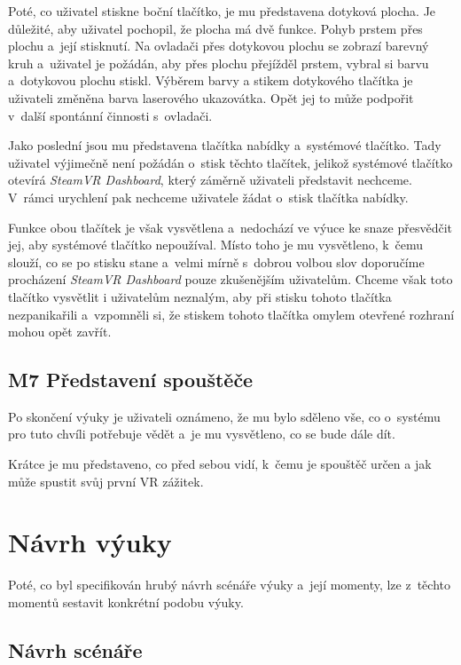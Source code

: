 Poté, co uživatel stiskne boční tlačítko, je mu představena dotyková
plocha. Je důležité, aby uživatel pochopil, že plocha má dvě funkce. Pohyb
prstem přes plochu a~její stisknutí. Na ovladači přes dotykovou plochu
se zobrazí barevný kruh a~uživatel je požádán, aby přes plochu přejížděl
prstem, vybral si barvu a~dotykovou plochu stiskl. Výběrem barvy a
stikem dotykového tlačítka je uživateli změněna barva laserového
ukazovátka. Opět jej to může podpořit v~další spontánní činnosti
s~ovladači.

Jako poslední jsou mu představena tlačítka nabídky a~systémové tlačítko.
Tady uživatel výjimečně není požádán o~stisk těchto tlačítek, jelikož
systémové tlačítko otevírá \emph{SteamVR Dashboard}, který záměrně
uživateli představit nechceme. V~rámci urychlení pak nechceme uživatele
žádat o~stisk tlačítka nabídky.

Funkce obou tlačítek je však vysvětlena a~nedochází ve výuce ke snaze
přesvědčit jej, aby systémové tlačítko nepoužíval. Místo toho je mu
vysvětleno, k~čemu slouží, co se po stisku stane a~velmi mírně s~dobrou
volbou slov doporučíme procházení \emph{SteamVR Dashboard} pouze
zkušenějším uživatelům. Chceme však toto tlačítko vysvětlit i uživatelům
neznalým, aby při stisku tohoto tlačítka nezpanikařili a~vzpomněli si,
že stiskem tohoto tlačítka omylem otevřené rozhraní mohou opět zavřít.

\subsection{M7 Představení
spouštěče}\label{m7-pux159edstavenuxed-spouux161tux11bux10de}

Po skončení výuky je uživateli oznámeno, že mu bylo sděleno vše, co
o~systému pro tuto chvíli potřebuje vědět a~je mu vysvětleno, co se bude
dále dít.

Krátce je mu představeno, co před sebou vidí, k~čemu je spouštěč určen a
jak může spustit svůj první VR zážitek.

\section{Návrh výuky}\label{nuxe1vrh-vuxfduky}

Poté, co byl specifikován hrubý návrh scénáře výuky a~její momenty, lze
z~těchto momentů sestavit konkrétní podobu výuky.

\subsection{Návrh scénáře}\label{nuxe1vrh-scuxe9nuxe1ux159e}

